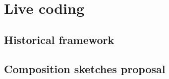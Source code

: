 \chapter{Live coding}
\section{Historical framework}\label{historical-framework}

\section{Composition sketches proposal}\label{composition-sketches-proposal}